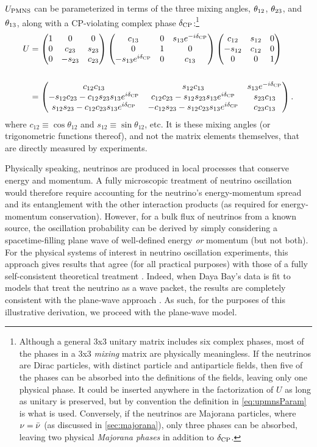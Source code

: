 \documentclass[../thesis.tex]{subfiles}
\begin{document}
$U_\mathrm{PMNS}$ can be parameterized in terms of the three mixing angles, $\theta_{12}$, $\theta_{23}$, and $\theta_{13}$, along with a CP-violating complex phase $\delta_\text{CP}$:\footnote{Although a general 3x3 unitary matrix includes six complex phases, most of the phases in a 3x3 \emph{mixing} matrix are physically meaningless. If the neutrinos are Dirac particles, with distinct particle and antiparticle fields, then five of the phases can be absorbed into the definitions of the fields, leaving only one physical phase. It could be inserted anywhere in the factorization of $U$ as long as unitary is preserved, but by convention the definition in \eqref{eq:upmnsParam} is what is used. Conversely, if the neutrinos are Majorana particles, where $\nu = \bar\nu$ (as discussed in \autoref{sec:majorana}), only three phases can be absorbed, leaving two physical \emph{Majorana phases} in addition to $\delta_\text{CP}$.}
\begin{align}
  \label{eq:upmnsParam}
  \begin{split}
    U &= \begin{pmatrix} 1 & 0 & 0 \\ 0 & c_{23} & s_{23} \\ 0 & -s_{23} & c_{23} \end{pmatrix} \begin{pmatrix} c_{13} & 0 & s_{13}e^{-i\delta_\text{CP}} \\ 0 & 1 & 0 \\ -s_{13}e^{i\delta_\text{CP}} & 0 & c_{13} \end{pmatrix} \begin{pmatrix} c_{12} & s_{12} & 0 \\ -s_{12} & c_{12} & 0 \\ 0 & 0 & 1 \end{pmatrix} \\\\
    &= \begin{pmatrix} c_{12}c_{13} & s_{12} c_{13} & s_{13}e^{-i\delta_\text{CP}} \\ -s_{12}c_{23} - c_{12}s_{23}s_{13}e^{i\delta_\text{CP}} & c_{12}c_{23} - s_{12}s_{23}s_{13}e^{i\delta_\text{CP}} & s_{23}c_{13}\\s_{12}s_{23} - c_{12}c_{23}s_{13}e^{i\delta_\text{CP}} & -c_{12}s_{23} - s_{12}c_{23}s_{13}e^{i\delta_\text{CP}} & c_{23}c_{13} \end{pmatrix}.
  \end{split}
\end{align}
where \(c_{12} \equiv \cos\theta_{12}\) and \(s_{12} \equiv \sin\theta_{12}\), etc. It is these mixing angles (or trigonometric functions thereof), and not the matrix elements themselves, that are directly measured by experiments.

Physically speaking, neutrinos are produced in local processes that conserve energy and momentum. A fully microscopic treatment of neutrino oscillation would therefore require accounting for the neutrino's energy-momentum spread and its entanglement with the other interaction products (as required for energy-momentum conservation). However, for a bulk flux of neutrinos from a known source, the oscillation probability can be derived by simply considering a spacetime-filling plane wave of well-defined energy \emph{or} momentum (but not both). For the physical systems of interest in neutrino oscillation experiments, this approach gives results that agree (for all practical purposes) with those of a fully self-consistent theoretical treatment \cite{Ligeti}. Indeed, when Daya Bay's data is fit to models that treat the neutrino as a wave packet, the results are completely consistent with the plane-wave approach \cite{DayaBayWavePacket}. As such, for the purposes of this illustrative derivation, we proceed with the plane-wave model.
\end{document}
